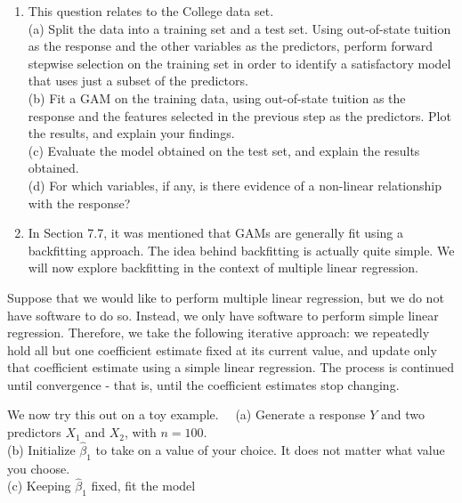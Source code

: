 \documentclass[10pt]{article}
\begin{document}
\begin{enumerate}
(e) Now fit a regression spline for a range of degrees of freedom, and plot the resulting fits and report the resulting RSS. Describe the results obtained.\\
(f) Perform cross-validation or another approach in order to select the best degrees of freedom for a regression spline on this data. Describe your results.
  \item This question relates to the College data set.\\
(a) Split the data into a training set and a test set. Using out-of-state tuition as the response and the other variables as the predictors, perform forward stepwise selection on the training set in order to identify a satisfactory model that uses just a subset of the predictors.\\
(b) Fit a GAM on the training data, using out-of-state tuition as the response and the features selected in the previous step as the predictors. Plot the results, and explain your findings.\\
(c) Evaluate the model obtained on the test set, and explain the results obtained.\\
(d) For which variables, if any, is there evidence of a non-linear relationship with the response?
  \item In Section 7.7, it was mentioned that GAMs are generally fit using a backfitting approach. The idea behind backfitting is actually quite simple. We will now explore backfitting in the context of multiple linear regression.
\end{enumerate}

Suppose that we would like to perform multiple linear regression, but we do not have software to do so. Instead, we only have software to perform simple linear regression. Therefore, we take the following iterative approach: we repeatedly hold all but one coefficient estimate fixed at its current value, and update only that coefficient estimate using a simple linear regression. The process is continued until convergence - that is, until the coefficient estimates stop changing.

We now try this out on a toy example.\
\
(a) Generate a response $Y$ and two predictors $X_{1}$ and $X_{2}$, with $n=100$.\\
(b) Initialize $\hat{\beta}_{1}$ to take on a value of your choice. It does not matter what value you choose.\\
(c) Keeping $\hat{\beta}_{1}$ fixed, fit the model
\end{document}
